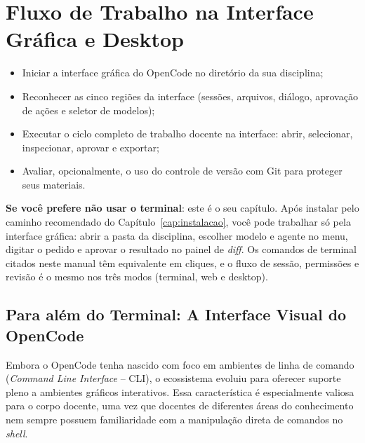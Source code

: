 \chapter{Fluxo de Trabalho na Interface Gr{\'a}fica e Desktop}
\label{cap:desktop}

\begin{objetivos}
\begin{itemize}
  \item Iniciar a interface gr{\'a}fica do OpenCode no diret{\'o}rio da sua disciplina;
  \item Reconhecer as cinco regi{\~o}es da interface (sess{\~o}es, arquivos, di{\'a}logo, aprova{\c c}{\~a}o de a{\c c}{\~o}es e seletor de modelos);
  \item Executar o ciclo completo de trabalho docente na interface: abrir, selecionar, inspecionar, aprovar e exportar;
  \item Avaliar, opcionalmente, o uso do controle de vers{\~a}o com Git para proteger seus materiais.
\end{itemize}
\end{objetivos}

\begin{dicaopencode}
\textbf{Se voc{\^e} prefere n{\~a}o usar o terminal}: este {\'e} o seu cap{\'i}tulo. Ap{\'o}s instalar pelo caminho recomendado do Cap{\'i}tulo~\ref{cap:instalacao}, voc{\^e} pode trabalhar s{\'o} pela interface gr{\'a}fica: abrir a pasta da disciplina, escolher modelo e agente no menu, digitar o pedido e aprovar o resultado no painel de \emph{diff}. Os comandos de terminal citados neste manual t{\^e}m equivalente em cliques, e o fluxo de sess{\~a}o, permiss{\~o}es e revis{\~a}o {\'e} o mesmo nos tr{\^e}s modos (terminal, web e desktop).
\end{dicaopencode}

\section{Para al{\'e}m do Terminal: A Interface Visual do OpenCode}

Embora o OpenCode tenha nascido com foco em ambientes de linha de comando (\emph{Command Line Interface} -- CLI), o ecossistema evoluiu para oferecer suporte pleno a ambientes gr{\'a}ficos interativos. Essa caracter{\'i}stica {\'e} especialmente valiosa para o corpo docente, uma vez que docentes de diferentes {\'a}reas do conhecimento nem sempre possuem familiaridade com a manipula{\c c}{\~a}o direta de comandos no \emph{shell}.

